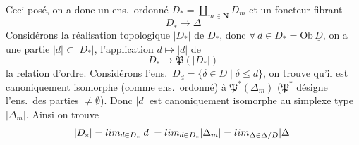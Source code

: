 \documentclass[11pt,a4paper]{article}
\begin{document}
Ceci posé, on a donc un ens.\ ordonné $D_* = \coprod_{m \in \mathbf{N}}
D_m$ et un foncteur fibrant
\[
  \underline{D}_* \longrightarrow \Delta
\]
Considérons la réalisation topologique $|D_*|$ de $D_*$, donc $\forall\, d
\in D_* = \mathrm{Ob}\,\underline{D}$, on a une partie  $|d|
\subset |D_*|$, l'application $d \mapsto |d|$ de
\[
  D_* \to \mathfrak{P}(|D_*|)
\]
  
 la relation d'ordre. Considérons  \struck{\ill{}} l'ens.\ $D_d = \lbrace \delta \in D \mid \delta
\leqslant d \rbrace$, on trouve qu'il est canoniquement isomorphe (comme
ens.\ ordonné) à $\mathfrak{P}^*(\Delta_m)$ ($\mathfrak{P}^*$ désigne
l'ens.\ des parties $\neq \emptyset$). Donc $|d|$ est canoniquement
isomorphe au simplexe type $|\Delta_m|$. Ainsi on trouve
\[
  |D_*| = \varinjlim_{d \in D_*} |d| = \varinjlim_{d \in D_*} |\Delta_m| =
  \varinjlim_{\Delta \in \Delta/D} |\Delta|
\]
\end{document}
